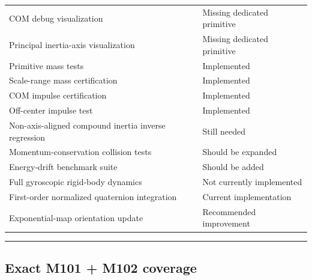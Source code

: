 {\begin{longtable}[]{@{}
  >{\raggedright\arraybackslash}p{}
  >{\raggedright\arraybackslash}p{}@{}}
COM debug visualization & Missing dedicated primitive \\
Principal inertia-axis visualization & Missing dedicated primitive \\
Primitive mass tests & Implemented \\
Scale-range mass certification & Implemented \\
COM impulse certification & Implemented \\
Off-center impulse test & Implemented \\
Non-axis-aligned compound inertia inverse regression & Still needed \\
Momentum-conservation collision tests & Should be expanded \\
Energy-drift benchmark suite & Should be added \\
Full gyroscopic rigid-body dynamics & Not currently implemented \\
First-order normalized quaternion integration & Current implementation \\
Exponential-map orientation update & Recommended improvement \\
\end{longtable}
}

\begin{center}\rule{0.5\linewidth}{0.5pt}\end{center}

\subsection{Exact M101 + M102 coverage}\label{06-engine-ii-ch039-exact-m101-m102-coverage}


